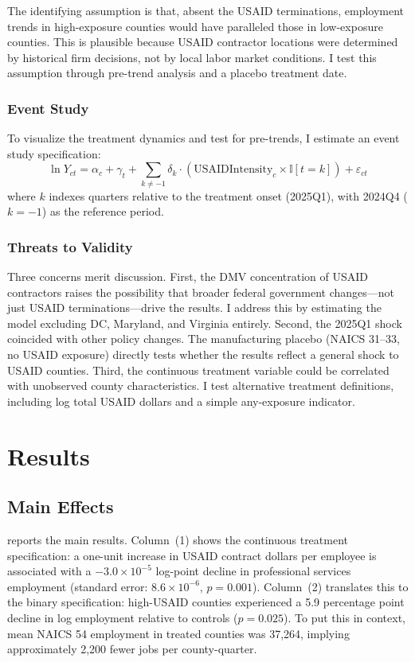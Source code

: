 \documentclass[12pt]{article}
\newcommand{\ind}{\mathbb{I}}
\begin{document}
The identifying assumption is that, absent the USAID terminations, employment trends in high-exposure counties would have paralleled those in low-exposure counties. This is plausible because USAID contractor locations were determined by historical firm decisions, not by local labor market conditions. I test this assumption through pre-trend analysis and a placebo treatment date.

\subsubsection*{Event Study} To visualize the treatment dynamics and test for pre-trends, I estimate an event study specification:
\begin{equation}
\ln Y_{ct} = \alpha_c + \gamma_t + \sum_{k \neq -1} \delta_k \cdot (\text{USAIDIntensity}_c \times \ind[t = k]) + \varepsilon_{ct}
\end{equation}
where $k$ indexes quarters relative to the treatment onset (2025Q1), with 2024Q4 ($k = -1$) as the reference period.

\subsubsection*{Threats to Validity} Three concerns merit discussion. First, the DMV concentration of USAID contractors raises the possibility that broader federal government changes---not just USAID terminations---drive the results. I address this by estimating the model excluding DC, Maryland, and Virginia entirely. Second, the 2025Q1 shock coincided with other policy changes. The manufacturing placebo (NAICS 31--33, no USAID exposure) directly tests whether the results reflect a general shock to USAID counties. Third, the continuous treatment variable could be correlated with unobserved county characteristics. I test alternative treatment definitions, including log total USAID dollars and a simple any-exposure indicator.

\section{Results}
\label{sec:results}

\subsection{Main Effects}

{\small}

 reports the main results. Column~(1) shows the continuous treatment specification: a one-unit increase in USAID contract dollars per employee is associated with a $-3.0 \times 10^{-5}$ log-point decline in professional services employment (standard error: $8.6 \times 10^{-6}$, $p = 0.001$). Column~(2) translates this to the binary specification: high-USAID counties experienced a 5.9 percentage point decline in log employment relative to controls ($p = 0.025$). To put this in context, mean NAICS 54 employment in treated counties was 37,264, implying approximately 2,200 fewer jobs per county-quarter.
\end{document}
